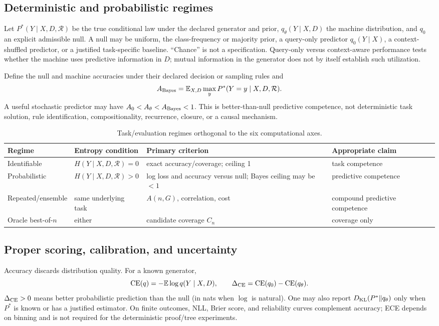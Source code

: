 \documentclass[10pt]{article}
\begin{document}
\subsection{Deterministic and probabilistic regimes}
Let $P^*(Y\mid X,D,\mathcal R)$ be the true conditional law under the declared generator and prior, $q_\theta(Y\mid X,D)$ the machine distribution, and $q_0$ an explicit admissible null. A null may be uniform, the class-frequency or majority prior, a query-only predictor $q_0(Y\mid X)$, a context-shuffled predictor, or a justified task-specific baseline. ``Chance'' is not a specification. Query-only versus context-aware performance tests whether the machine uses predictive information in $D$; mutual information in the generator does not by itself establish such utilization.

Define the null and machine accuracies under their declared decision or sampling rules and
\[
A_{\rm Bayes}=\mathbb E_{X,D}\max_y P^*(Y=y\mid X,D,\mathcal R).
\]
A useful stochastic predictor may have $A_0<A_\theta<A_{\rm Bayes}<1$. This is better-than-null predictive competence, not deterministic task solution, rule identification, compositionality, recurrence, closure, or a causal mechanism.

\begin{table}[H]\centering\scriptsize
\begin{tabularx}{\linewidth}{p{.2\linewidth}p{.22\linewidth}YY}\toprule Regime&Entropy condition&Primary criterion&Appropriate claim\\\midrule
Identifiable&$H(Y\mid X,D,\mathcal R)=0$&exact accuracy/coverage; ceiling 1&task competence\\
Probabilistic&$H(Y\mid X,D,\mathcal R)>0$&log loss and accuracy versus null; Bayes ceiling may be $<1$&predictive competence\\
Repeated/ensemble&same underlying task&$A(n,G)$, correlation, cost&compound predictive competence\\
Oracle best-of-$n$&either&candidate coverage $C_n$&coverage only\\\bottomrule
\end{tabularx}\caption{Task/evaluation regimes orthogonal to the six computational axes.}\end{table}

\subsection{Proper scoring, calibration, and uncertainty}
Accuracy discards distribution quality. For a known generator,
\[
\operatorname{CE}(q)=-\mathbb E\log q(Y\mid X,D),\qquad
\Delta_{\rm CE}=\operatorname{CE}(q_0)-\operatorname{CE}(q_\theta).
\]
$\Delta_{\rm CE}>0$ means better probabilistic prediction than the null (in nats when $\log$ is natural). One may also report $D_{\rm KL}(P^*\Vert q_\theta)$ only when $P^*$ is known or has a justified estimator. On finite outcomes, NLL, Brier score, and reliability curves complement accuracy; ECE depends on binning and is not required for the deterministic proof/tree experiments.
\end{document}
